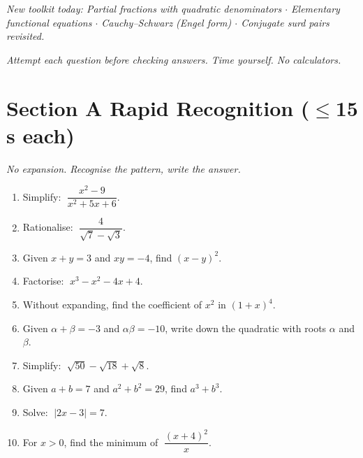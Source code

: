 \documentclass[11pt,a4paper]{article}
\begin{document}
\noindent\textit{New toolkit today: Partial fractions with quadratic denominators $\cdot$ Elementary functional equations $\cdot$ Cauchy--Schwarz (Engel form) $\cdot$ Conjugate surd pairs revisited.}

\vspace{2pt}
\noindent\textit{Attempt each question before checking answers. Time yourself. No calculators.}

\section*{Section A \quad Rapid Recognition \hfill{\normalfont\small($\leq$15 s each)}}

\noindent\textit{No expansion. Recognise the pattern, write the answer.}

\begin{enumerate}

\item Simplify: $\;\dfrac{x^2 - 9}{x^2 + 5x + 6}$.

\item Rationalise: $\;\dfrac{4}{\sqrt{7} - \sqrt{3}}$.

\item Given $x + y = 3$ and $xy = -4$, find $(x-y)^2$.

\item Factorise: $\;x^3 - x^2 - 4x + 4$.

\item Without expanding, find the coefficient of $x^2$ in $(1+x)^4$.

\item Given $\alpha + \beta = -3$ and $\alpha\beta = -10$, write down the quadratic
      with roots $\alpha$ and $\beta$.

\item Simplify: $\;\sqrt{50} - \sqrt{18} + \sqrt{8}$.

\item Given $a + b = 7$ and $a^2 + b^2 = 29$, find $a^3 + b^3$.

\item Solve: $\;|2x - 3| = 7$.

\item For $x > 0$, find the minimum of $\;\dfrac{(x+4)^2}{x}$.

\end{enumerate}
\end{document}
